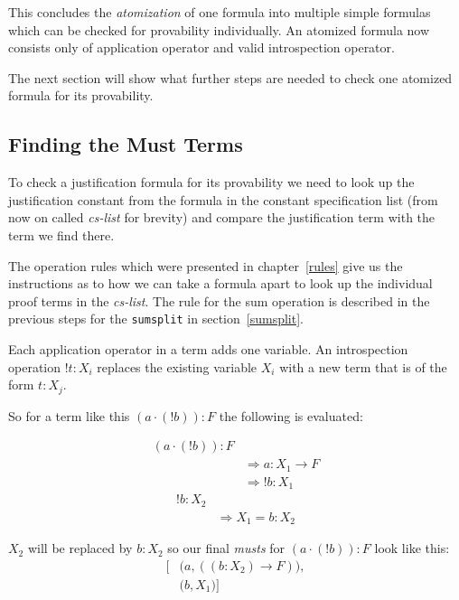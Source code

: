 

This concludes the \emph{atomization} of one formula into multiple simple formulas which can be checked for provability individually. An atomized formula now consists only of application operator and valid introspection operator. 

The next section will show what further steps are needed to check one atomized formula for its provability.

\subsection{Finding the Must Terms}\label{chap:Algorithm.musts}
To check a justification formula for its provability we need to look up the justification constant from the formula in the constant specification list (from now on called \emph{cs-list} for brevity) and compare the justification term with the term we find there.

The operation rules which were presented in chapter~\ref{rules} give us the instructions as to how we can take a formula apart to look up the individual proof terms in the \emph{cs-list}. The rule for the sum operation is described in the previous steps for the \texttt{sumsplit} in section~\ref{sumsplit}.

Each application operator in a term adds one variable. An introspection operation $!t:X_i$ replaces the existing variable $X_i$ with a new term that is of the form $t:X_j$. 

So for a term like this $(a \cdot (!b)):F$ the following is evaluated:

\begin{equation}\label{musts1}
\begin{split}
	(a \cdot (!b)): F \\
	& \Rightarrow a: X_1 \rightarrow F\\
	& \Rightarrow !b: X_1
\end{split}
\end{equation}
\begin{equation}\label{musts2}
\begin{split}
	!b: X_2 \\
	& \Rightarrow X_1 = b:X_2
\end{split}
\end{equation}

$X_2$ will be replaced by $b:X_2$ so our final \emph{musts} for $(a \cdot (!b)):F$ look like this: 
\begin{align*}\label{must-list}
 [ 	&\bigl( a, ((b:X_2) \rightarrow  F) \bigr) , \\
 	&\bigl( b, X_1 \bigr) ] 
\end{align*}

